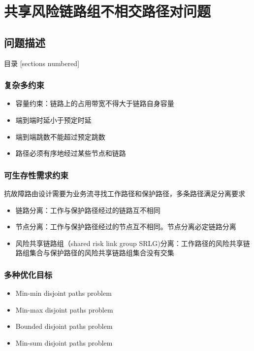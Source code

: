 \section{共享风险链路组不相交路径对问题}
\subsection{问题描述}
\begin{frame}{目录}
    [sections numbered]
\end{frame}
\addtocounter{framenumber}{-1}  %

\begin{frame}
\frametitle{复杂多约束}
  \begin{itemize}
    \item 容量约束：链路上的占用带宽不得大于链路自身容量
    \item 端到端时延小于预定时延
    \item 端到端跳数不能超过预定跳数
    \item 路径必须有序地经过某些节点和链路
  \end{itemize}
\end{frame}

\begin{frame}
\frametitle{可生存性需求约束}
抗故障路由设计需要为业务流寻找工作路径和保护路径，多条路径满足分离要求
\begin{itemize}
  \item 链路分离：工作与保护路径经过的链路互不相同
  \item 节点分离：工作与保护路径经过的节点互不相同。节点分离必定链路分离
  \item 风险共享链路组（shared risk link group SRLG)分离：工作路径的风险共享链路组集合与保护路径的风险共享链路组集合没有交集
\end{itemize}
\end{frame}

\begin{frame}
\frametitle{多种优化目标}
\begin{itemize}
  \item Min-min disjoint paths problem
  \item Min-max disjoint paths problem
  \item Bounded disjoint paths problem
  \item Min-sum disjoint paths problem
\end{itemize}
\end{frame}

